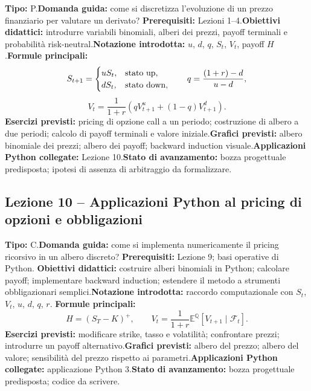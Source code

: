 \documentclass[12pt,a4paper]{article}%
\begin{document}
\textbf{Tipo:} P.\newline\textbf{Domanda guida:} come si discretizza
l'evoluzione di un prezzo finanziario per valutare un derivato?\newline%
\textbf{Prerequisiti:} Lezioni 1--4.\newline\textbf{Obiettivi didattici:}
introdurre variabili binomiali, alberi dei prezzi, payoff terminali e
probabilit\`{a} risk-neutral.\newline\textbf{Notazione introdotta:} $u$, $d$,
$q$, $S_{t}$, $V_{t}$, payoff $H$.\newline\textbf{Formule principali:}
\[
S_{t+1}=%
\begin{cases}
uS_{t}, & \hbox{stato up},\\
dS_{t}, & \hbox{stato down},
\end{cases}
\qquad q=\frac{(1+r)-d}{u-d},
\]
\[
V_{t}=\frac{1}{1+r}\left(  qV_{t+1}^{u}+(1-q)V_{t+1}^{d}\right)  .
\]
\textbf{Esercizi previsti:} pricing di opzione call a un periodo; costruzione
di albero a due periodi; calcolo di payoff terminali e valore
iniziale.\newline\textbf{Grafici previsti:} albero binomiale dei prezzi;
albero dei payoff; backward induction visuale.\newline\textbf{Applicazioni
Python collegate:} Lezione 10.\newline\textbf{Stato di avanzamento:} bozza
progettuale predisposta; ipotesi di assenza di arbitraggio da formalizzare.

\subsection{Lezione 10 -- Applicazioni Python al pricing di opzioni e
obbligazioni}

\textbf{Tipo:} C.\newline\textbf{Domanda guida:} come si implementa
numericamente il pricing ricorsivo in un albero discreto?\newline%
\textbf{Prerequisiti:} Lezione 9; basi operative di Python.\newline%
\textbf{Obiettivi didattici:} costruire alberi binomiali in Python; calcolare
payoff; implementare backward induction; estendere il metodo a strumenti
obbligazionari semplici.\newline\textbf{Notazione introdotta:} raccordo
computazionale con $S_{t}$, $V_{t}$, $u$, $d$, $q$, $r$.\newline%
\textbf{Formule principali:}
\[
H=(S_{T}-K)^{+}, \qquad V_{t}=\frac{1}{1+r}\mathbb{E}^{\mathbb{Q}}[V_{t+1}%
\mid\mathcal{F}_{t}].
\]
\textbf{Esercizi previsti:} modificare strike, tasso e volatilit\`{a};
confrontare prezzi; introdurre un payoff alternativo.\newline\textbf{Grafici
previsti:} albero del prezzo; albero del valore; sensibilit\`{a} del prezzo
rispetto ai parametri.\newline\textbf{Applicazioni Python collegate:}
applicazione Python 3.\newline\textbf{Stato di avanzamento:} bozza progettuale
predisposta; codice da scrivere.
\end{document}
